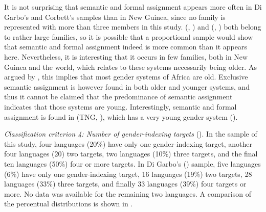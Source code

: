 \documentclass[output=collectionpaper]{langsci/langscibook}
\begin{document}
It is not surprising that semantic and formal assignment appears more often in Di Garbo's and Corbett's samples than in New Guinea, since no family is represented with more than three members in this study.  (, ) and  (, ) both belong to rather large families, so it is possible that a proportional sample would show that semantic and formal assignment indeed is more common than it appears here. Nevertheless, it is interesting that it occurs in few families, both in New Guinea and the world, which \citet{Corbett2013b} relates to these systems necessarily being older. As argued by \citet{Luraghi2011}, this implies that most gender systems of Africa are old. Exclusive semantic assignment is however found in both older and younger systems, and thus it cannot be claimed that the predominance of semantic assignment indicates that those systems are young. Interestingly, semantic and formal assignment is found in  (TNG, ), which has a very young gender system (\citealt{Waelchli2018}).



\textit{Classification criterion 4: Number of gender-indexing targets} ().
In the sample of this study, four languages (20\%) have only one gender-indexing target, another four languages (20) two targets, two languages (10\%) three targets, and the final ten languages (50\%) four or more targets. In Di Garbo's (\citeyear[68]{DiGarbo2014}) sample, five languages (6\%) have only one gender-indexing target, 16 languages (19\%) two targets, 28 languages (33\%) three targets, and finally 33 languages (39\%) four targets or more. No data was available for the remaining two languages. A comparison of the percentual distributions is shown in .
\end{document}
